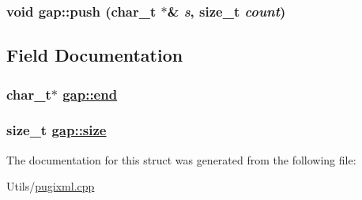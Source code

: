 \hypertarget{structgap_9c0d0b12bc778c8439c8aec7747ab2b0}{
\subsubsection[push]{\setlength{\rightskip}{0pt plus 5cm}void gap::push (char\_\-t $\ast$\& {\em s}, size\_\-t {\em count})}}
\label{structgap_9c0d0b12bc778c8439c8aec7747ab2b0}




\subsection{Field Documentation}
\hypertarget{structgap_1fafd4d9909a3413f723f24e46dfde0e}{
\subsubsection[end]{\setlength{\rightskip}{0pt plus 5cm}char\_\-t$\ast$ \hyperlink{structgap_1fafd4d9909a3413f723f24e46dfde0e}{gap::end}}}
\label{structgap_1fafd4d9909a3413f723f24e46dfde0e}


\hypertarget{structgap_d5bb3597ade78d89bbe0e300748ad508}{
\subsubsection[size]{\setlength{\rightskip}{0pt plus 5cm}size\_\-t \hyperlink{structgap_d5bb3597ade78d89bbe0e300748ad508}{gap::size}}}
\label{structgap_d5bb3597ade78d89bbe0e300748ad508}




The documentation for this struct was generated from the following file:\begin{CompactItemize}
\item 
Utils/\hyperlink{pugixml_8cpp}{pugixml.cpp}\end{CompactItemize}
